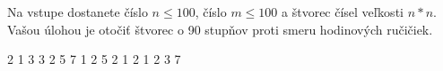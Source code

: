 




Na vstupe dostanete číslo $n \leq 100$, číslo $m \leq 100$ a štvorec čísel veľkosti $n*n$. Vašou úlohou je otočiť štvorec o 90 stupňov proti smeru hodinových ručičiek.

2 1 3 
3 2 5 
7 1 2 
 5 2 
1 2 1 
2 3 7 
\koniec



